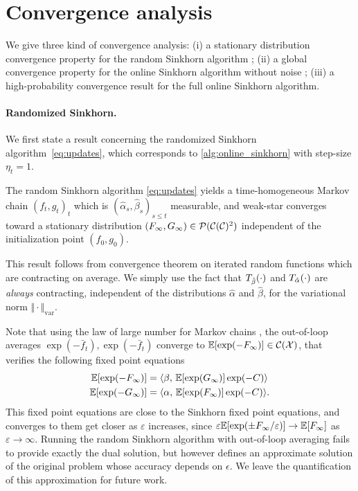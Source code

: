 

\section{Convergence analysis}

We give three kind of convergence analysis: (i) a stationary distribution convergence property for the random Sinkhorn
algorithm ; (ii) a global convergence property for the online Sinkhorn algorithm without noise ; (iii) a high-probability convergence result for the full online Sinkhorn algorithm.

\paragraph{Randomized Sinkhorn.}

We first state a result concerning the randomized Sinkhorn algorithm~\eqref{eq:updates}, which corresponds to
\autoref{alg:online_sinkhorn} with step-size $\eta_t = 1$.

\begin{proposition}\label{prop:markov}
    The random Sinkhorn algorithm \eqref{eq:updates} yields a time-homogeneous
    Markov chain ${(f_t, g_t)}_t$ which is $(\hat \alpha_s, \hat \beta_s)_{s \leq
    t}$ measurable, and weak-star converges toward a stationary distribution
    $(F_\infty, G_\infty) \in \mathcal{P}(\mathcal{C}(\mathcal{C})^2)$ independent of the initialization
    point $(f_0, g_0)$.
\end{proposition}

This result follows from \citet{diaconis_iterated} convergence theorem on
iterated random functions which are contracting on average. We simply use the
fact that $T_{\hat \beta}(\cdot)$ and $T_{\hat \alpha}(\cdot)$ are
\textit{always} contracting, independent of the distributions $\hat \alpha$ and
$\hat \beta$, for the variational norm $\Vert \cdot \Vert_{\text{var}}$.

Note that using the law of large number for Markov chains
\citep{breiman_strong_1960}, the out-of-loop averages $\exp(-\bar f_t),
\exp(-\bar f_t)$ converge to $\mathbb{E}[\exp(-F_\infty)] \in \mathcal{C}(\mathcal{X})$, that verifies
the following fixed point equations
\begin{align}
    \mathbb{E}[\exp(-F_\infty)] &=
     \langle \beta,\,\mathbb{E}[\exp(G_\infty)] \exp(-C)\rangle \\
    \mathbb{E}[\exp(-G_\infty)] &=
     \langle \alpha,\,\mathbb{E}[\exp(F_\infty)] \exp(-C)\rangle.
\end{align}
This fixed point equations are close to the Sinkhorn fixed point equations, and converges to them 
get closer as $\varepsilon$ increases, since $\varepsilon \mathbb{E}[\exp(\pm F_\infty /
\varepsilon)] \to \mathbb{E}[F_\infty]$ as $\varepsilon \to \infty$. Running the random
Sinkhorn algorithm with out-of-loop averaging fails to provide exactly the dual solution, but 
however defines an approximate solution of the original problem whose accuracy depends on $\epsilon$. 
%
We leave the quantification of this approximation for future work.

